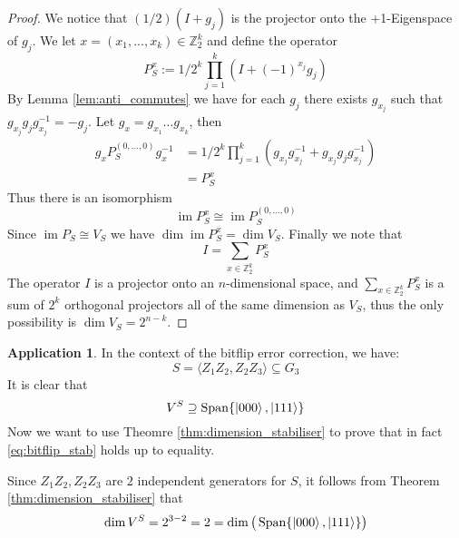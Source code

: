 \documentclass[12pt]{article}
\theoremstyle{plain}
\theoremstyle{definition}
\newtheorem{application}[thm]{Application}
\newcommand{\bb}[1]{\mathbb{#1}}
\begin{document}
	\begin{proof}
		We notice that $(1/2)(I + g_j)$ is the projector onto the +1-Eigenspace of $g_j$. We let $x = (x_1,...,x_k) \in \bb{Z}_2^k$ and define the operator
		\begin{equation}
			P_S^x := 1/2^{k}\prod_{j = 1}^k(I + (-1)^{x_{j}}g_j)
		\end{equation}
		By Lemma \ref{lem:anti_commutes} we have for each $g_j$ there exists $g_{x_j}$ such that $g_{x_j}g_j g_{x_j}^{-1} = -g_j$. Let $g_x = g_{x_1}\hdots g_{x_k}$, then
		\begin{align*}
			g_xP_S^{(0,...,0)} g_x^{-1} &= 1/2^k\prod_{j = 1}^k (g_{x_j}g_{x_j}^{-1} + g_{x_j} g_{j}g_{x_j}^{-1})\\
			&= P_S^x
		\end{align*}
		Thus there is an isomorphism
		\begin{equation}
			\operatorname{im}P_S^x \cong \operatorname{im}P_S^{(0,...,0)}
		\end{equation}
		Since $\operatorname{im}P_S \cong V_S$ we have $\operatorname{dim}\operatorname{im}P_S^x = \operatorname{dim}V_S$. Finally we note that
		\begin{equation}
			I = \sum_{x \in \bb{Z}_2^k}P_S^x
		\end{equation}
		The operator $I$ is a projector onto an $n$-dimensional space, and $\sum_{x \in \bb{Z}_2^k}P_S^x$ is a sum of $2^k$ orthogonal projectors all of the same dimension as $V_S$, thus
		the only possibility is $\operatorname{dim}V_S = 2^{n - k}$.
	\end{proof}

\begin{application}
	In the context of the bitflip error correction, we have:
	\begin{equation}
		S = \langle Z_1Z_2, Z_2Z_3 \rangle \subseteq G_3
		\end{equation}
	It is clear that
	\begin{equation}\label{eq:bitflip_stab}
		V^S \supseteq \operatorname{Span}\{ \ket{000}, \ket{111} \}
		\end{equation}
	Now we want to use Theomre \ref{thm:dimension_stabiliser} to prove that in fact \eqref{eq:bitflip_stab} holds up to equality.
	
	Since $Z_1Z_2, Z_2Z_3$ are $2$ independent generators for $S$, it follows from Theorem \ref{thm:dimension_stabiliser} that
	\begin{equation}
		\operatorname{dim}V^S = 2^{3 - 2} = 2 = \operatorname{dim}\big(\operatorname{Span}\{ \ket{000}, \ket{111} \}\big)
		\end{equation}
	\end{application}
\end{document}

